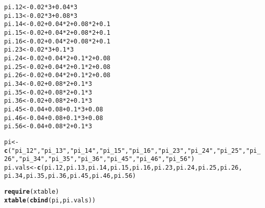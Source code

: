 \documentclass[12pt]{article}\usepackage[]{graphicx}\usepackage[]{color}
\makeatletter
\newcommand{\hlnum}[1]{\textcolor[rgb]{0.686,0.059,0.569}{#1}}%
\newcommand{\hlstr}[1]{\textcolor[rgb]{0.192,0.494,0.8}{#1}}%
\newcommand{\hlopt}[1]{\textcolor[rgb]{0,0,0}{#1}}%
\newcommand{\hlstd}[1]{\textcolor[rgb]{0.345,0.345,0.345}{#1}}%
\newcommand{\hlkwb}[1]{\textcolor[rgb]{0.69,0.353,0.396}{#1}}%
\newcommand{\hlkwd}[1]{\textcolor[rgb]{0.737,0.353,0.396}{\textbf{#1}}}%
\newenvironment{kframe}{%
 \def\at@end@of@kframe{}%
 \ifinner\ifhmode%
  \def\at@end@of@kframe{\end{minipage}}%
  \begin{minipage}{\columnwidth}%
 \fi\fi%
 \def\FrameCommand##1{\hskip\@totalleftmargin \hskip-\fboxsep
 \colorbox{shadecolor}{##1}\hskip-\fboxsep
     \hskip-\linewidth \hskip-\@totalleftmargin \hskip\columnwidth}%
 \MakeFramed {\advance\hsize-\width
   \@totalleftmargin\z@ \linewidth\hsize
   \@setminipage}}%
 {\par\unskip\endMakeFramed%
 \at@end@of@kframe}
\newenvironment{knitrout}{}{} %
\makeatother
\begin{document}
\begin{knitrout}\footnotesize
{}\color{fgcolor}\begin{kframe}
\begin{alltt}
\hlstd{pi.12} \hlkwb{<-} \hlnum{0.02}\hlopt{*}\hlnum{3} \hlopt{+} \hlnum{0.04}\hlopt{*}\hlnum{3}
\hlstd{pi.13} \hlkwb{<-} \hlnum{0.02}\hlopt{*}\hlnum{3} \hlopt{+} \hlnum{0.08}\hlopt{*}\hlnum{3}
\hlstd{pi.14} \hlkwb{<-} \hlnum{0.02} \hlopt{+} \hlnum{0.04}\hlopt{*}\hlnum{2} \hlopt{+} \hlnum{0.08}\hlopt{*}\hlnum{2} \hlopt{+} \hlnum{0.1}
\hlstd{pi.15} \hlkwb{<-} \hlnum{0.02} \hlopt{+} \hlnum{0.04}\hlopt{*}\hlnum{2} \hlopt{+} \hlnum{0.08}\hlopt{*}\hlnum{2} \hlopt{+} \hlnum{0.1}
\hlstd{pi.16} \hlkwb{<-} \hlnum{0.02} \hlopt{+} \hlnum{0.04}\hlopt{*}\hlnum{2} \hlopt{+} \hlnum{0.08}\hlopt{*}\hlnum{2} \hlopt{+} \hlnum{0.1}
\hlstd{pi.23} \hlkwb{<-} \hlnum{0.02}\hlopt{*}\hlnum{3} \hlopt{+} \hlnum{0.1}\hlopt{*}\hlnum{3}
\hlstd{pi.24} \hlkwb{<-} \hlnum{0.02} \hlopt{+} \hlnum{0.04}\hlopt{*}\hlnum{2} \hlopt{+} \hlnum{0.1}\hlopt{*}\hlnum{2} \hlopt{+} \hlnum{0.08}
\hlstd{pi.25} \hlkwb{<-} \hlnum{0.02} \hlopt{+} \hlnum{0.04}\hlopt{*}\hlnum{2} \hlopt{+} \hlnum{0.1}\hlopt{*}\hlnum{2} \hlopt{+} \hlnum{0.08}
\hlstd{pi.26} \hlkwb{<-} \hlnum{0.02} \hlopt{+} \hlnum{0.04}\hlopt{*}\hlnum{2} \hlopt{+} \hlnum{0.1}\hlopt{*}\hlnum{2} \hlopt{+} \hlnum{0.08}
\hlstd{pi.34} \hlkwb{<-} \hlnum{0.02} \hlopt{+} \hlnum{0.08}\hlopt{*}\hlnum{2} \hlopt{+} \hlnum{0.1}\hlopt{*}\hlnum{3}
\hlstd{pi.35} \hlkwb{<-} \hlnum{0.02} \hlopt{+} \hlnum{0.08}\hlopt{*}\hlnum{2} \hlopt{+} \hlnum{0.1}\hlopt{*}\hlnum{3}
\hlstd{pi.36} \hlkwb{<-} \hlnum{0.02} \hlopt{+} \hlnum{0.08}\hlopt{*}\hlnum{2} \hlopt{+} \hlnum{0.1}\hlopt{*}\hlnum{3}
\hlstd{pi.45} \hlkwb{<-} \hlnum{0.04} \hlopt{+} \hlnum{0.08} \hlopt{+} \hlnum{0.1}\hlopt{*}\hlnum{3} \hlopt{+} \hlnum{0.08}
\hlstd{pi.46} \hlkwb{<-} \hlnum{0.04} \hlopt{+} \hlnum{0.08} \hlopt{+} \hlnum{0.1}\hlopt{*}\hlnum{3} \hlopt{+} \hlnum{0.08}
\hlstd{pi.56} \hlkwb{<-} \hlnum{0.04} \hlopt{+} \hlnum{0.08}\hlopt{*}\hlnum{2} \hlopt{+} \hlnum{0.1}\hlopt{*}\hlnum{3}

\hlstd{pi} \hlkwb{<-} \hlkwd{c}\hlstd{(}\hlstr{"pi_12"}\hlstd{,} \hlstr{"pi_13"}\hlstd{,} \hlstr{"pi_14"}\hlstd{,} \hlstr{"pi_15"}\hlstd{,} \hlstr{"pi_16"}\hlstd{,} \hlstr{"pi_23"}\hlstd{,} \hlstr{"pi_24"}\hlstd{,} \hlstr{"pi_25"}\hlstd{,} \hlstr{"pi_26"}\hlstd{,} \hlstr{"pi_34"}\hlstd{,} \hlstr{"pi_35"}\hlstd{,} \hlstr{"pi_36"}\hlstd{,} \hlstr{"pi_45"}\hlstd{,} \hlstr{"pi_46"}\hlstd{,} \hlstr{"pi_56"}\hlstd{)}
\hlstd{pi.vals} \hlkwb{<-} \hlkwd{c}\hlstd{(pi.12, pi.13, pi.14, pi.15, pi.16, pi.23, pi.24, pi.25, pi.26,}
             \hlstd{pi.34, pi.35, pi.36, pi.45, pi.46, pi.56)}

\hlkwd{require}\hlstd{(xtable)}
\hlkwd{xtable}\hlstd{(}\hlkwd{cbind}\hlstd{(pi, pi.vals))}
\end{alltt}
\end{kframe}
\end{knitrout}
\end{document}
